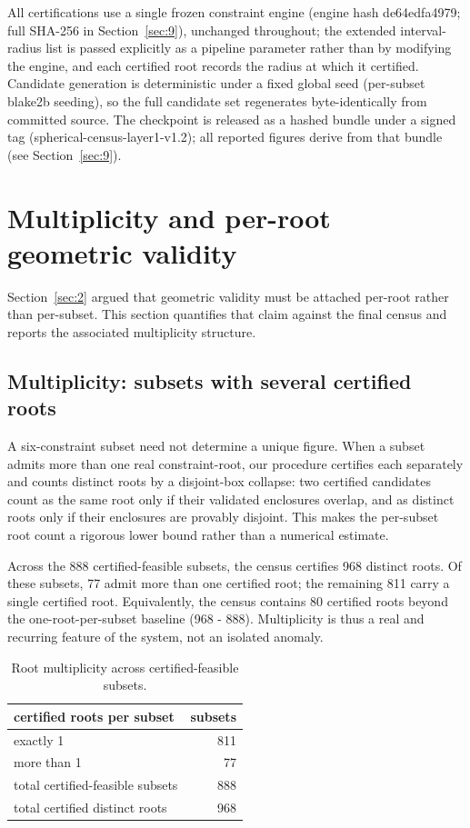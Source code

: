 \documentclass[pdflatex,sn-mathphys-num]{sn-jnl}
\begin{document}
All certifications use a single frozen constraint engine (engine hash de64edfa4979; full SHA-256 in Section~\ref{sec:9}), unchanged throughout; the extended interval-radius list is passed explicitly as a pipeline parameter rather
than by modifying the engine, and each certified root records the radius at which it certified. Candidate generation is deterministic under a fixed global seed (per-subset blake2b seeding), so the full candidate set regenerates byte-identically from committed source. The checkpoint is released as a hashed bundle under a signed tag (spherical-census-layer1-v1.2); all reported figures derive from that bundle (see Section~\ref{sec:9}).



\section{Multiplicity and per-root geometric validity}\label{sec:6}

Section~\ref{sec:2} argued that geometric validity must be attached per-root rather than per-subset. This section quantifies that claim against the final census and reports the associated multiplicity structure.

\subsection{Multiplicity: subsets with several certified roots}\label{sec:6.1}

A six-constraint subset need not determine a unique figure. When a subset admits more than one real constraint-root, our procedure certifies each separately and counts distinct roots by a disjoint-box collapse: two certified candidates count as the same root only if their validated enclosures overlap, and as distinct roots only if their enclosures are provably disjoint. This makes the per-subset root count a rigorous lower bound rather than a numerical estimate.

Across the 888 certified-feasible subsets, the census certifies 968 distinct roots. Of these subsets, 77 admit more than one certified root; the remaining 811 carry a single certified root. Equivalently, the census contains 80 certified roots beyond the one-root-per-subset baseline (968 - 888). Multiplicity
is thus a real and recurring feature of the system, not an isolated anomaly.

\begin{table}[htbp]
\centering
\caption{Root multiplicity across certified-feasible subsets.}
\label{tab:mult}
\begin{tabular}{lr}\hline
certified roots per subset & subsets \\\hline
exactly 1 & 811 \\
more than 1 & 77 \\\hline
total certified-feasible subsets & 888 \\
total certified distinct roots & 968 \\\hline
\end{tabular}
\end{table}
\end{document}
